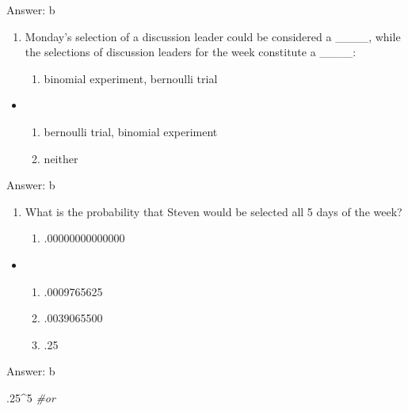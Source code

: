\documentclass[]{article}
\newenvironment{Shaded}{\begin{snugshade}}{\end{snugshade}}
\newcommand{\DecValTok}[1]{\textcolor[rgb]{0.00,0.00,0.81}{#1}}
\newcommand{\CommentTok}[1]{\textcolor[rgb]{0.56,0.35,0.01}{\textit{#1}}}
\newcommand{\OperatorTok}[1]{\textcolor[rgb]{0.81,0.36,0.00}{\textbf{#1}}}
\newcommand{\NormalTok}[1]{#1}
\providecommand{\tightlist}{%
  \setlength{\itemsep}{0pt}\setlength{\parskip}{0pt}}
\begin{document}
Answer: b

\begin{enumerate}
\def\labelenumi{\arabic{enumi}.}
\setcounter{enumi}{26}
\item
  Monday's selection of a discussion leader could be considered a
  \_\_\_\_, while the selections of discussion leaders for the week
  constitute a \_\_\_\_:

  \begin{enumerate}
  \def\labelenumii{\alph{enumii}.}
  \tightlist
  \item
    binomial experiment, bernoulli trial
  \end{enumerate}
\end{enumerate}

\begin{itemize}
\item
  \begin{enumerate}
  \def\labelenumi{\alph{enumi}.}
  \setcounter{enumi}{1}
  \tightlist
  \item
    bernoulli trial, binomial experiment
  \item
    neither
  \end{enumerate}
\end{itemize}

Answer: b

\begin{enumerate}
\def\labelenumi{\arabic{enumi}.}
\setcounter{enumi}{27}
\item
  What is the probability that Steven would be selected all 5 days of
  the week?

  \begin{enumerate}
  \def\labelenumii{\alph{enumii}.}
  \tightlist
  \item
    .00000000000000
  \end{enumerate}
\end{enumerate}

\begin{itemize}
\item
  \begin{enumerate}
  \def\labelenumi{\alph{enumi}.}
  \setcounter{enumi}{1}
  \tightlist
  \item
    .0009765625
  \item
    .0039065500
  \item
    .25
  \end{enumerate}
\end{itemize}

Answer: b

\begin{Shaded}
\begin{Highlighting}[]
\NormalTok{.}\DecValTok{25}\OperatorTok{^}\DecValTok{5} \CommentTok{#or}
\end{Highlighting}
\end{Shaded}
\end{document}
